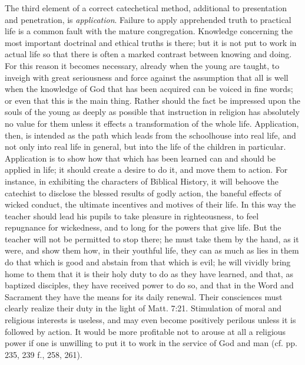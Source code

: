 The third element of a correct catechetical method, additional to presentation and penetration, is \emph{application}. Failure to apply apprehended truth to practical life is a common fault with the mature congregation. Knowledge concerning the most important doctrinal and ethical truths is there; but it is not put to work in actual life so that there is often a marked contrast between knowing and doing. For this reason it becomes necessary, already when the young are taught, to inveigh with great seriousness and force against the assumption that all is well when the knowledge of God that has been acquired can be voiced in fine words; or even that
this is the main thing. Rather should the fact be impressed upon the souls of the young as deeply as possible that instruction in religion has absolutely no value for them unless it effects a transformation of the whole life. Application, then, is intended as the path which leads from the schoolhouse into real life, and not only into real life in general, but into the life of the children in particular. Application is to show how that which has been learned can and should be applied in life; it should create a desire to do it, and move them to action. For instance, in exhibiting the characters of Biblical History, it will behoove the catechist to disclose the blessed results of godly action, the baneful effects of wicked conduct, the ultimate incentives and motives of their life. In this way the teacher should lead his pupils to take pleasure in righteousness, to feel repugnance for wickedness, and to long for the powers that give life. But the teacher will not be permitted to stop there; he must take them by the hand, as it were, and show them how, in their youthful life, they can as much as lies in them do that which is good and abstain from that which is evil; he will vividly bring home to them that it is their holy duty to do as they have learned, and that, as baptized disciples, they have received power to do so, and that in the Word and Sacrament they have the means for its daily renewal. Their consciences must clearly realize their duty in the light of Matt. 7:21. Stimulation of moral and religious interests is useless, and may even become positively perilous unless it is followed by action. It would be more profitable not to arouse at all a religious power if one is unwilling to put it to work in the service of God and man (cf. pp. 235, 239 f., 258, 261).

